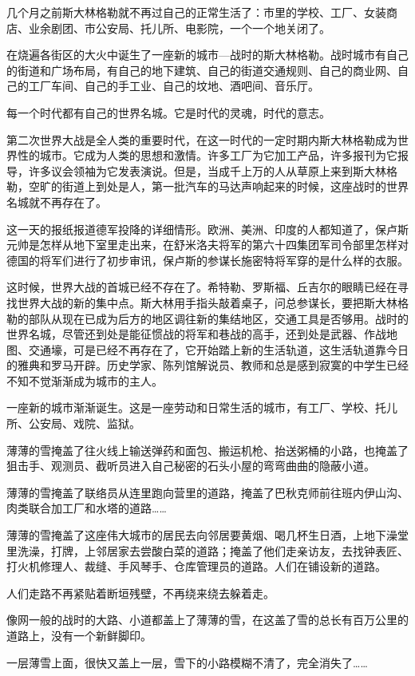 几个月之前斯大林格勒就不再过自己的正常生活了：市里的学校、工厂、女装商店、业余剧团、市公安局、托儿所、电影院，一个一个地关闭了。

在烧遍各街区的大火中诞生了一座新的城市—战时的斯大林格勒。战时城市有自己的街道和广场布局，有自己的地下建筑、自己的街道交通规则、自己的商业网、自己的工厂车间、自己的手工业、自己的坟地、酒吧间、音乐厅。

每一个时代都有自己的世界名城。它是时代的灵魂，时代的意志。

第二次世界大战是全人类的重要时代，在这一时代的一定时期内斯大林格勒成为世界性的城市。它成为人类的思想和激情。许多工厂为它加工产品，许多报刊为它报导，许多议会领袖为它发表演说。但是，当成千上万的人从草原上来到斯大林格勒，空旷的街道上到处是人，第一批汽车的马达声响起来的时候，这座战时的世界名城就不再存在了。

这一天的报纸报道德军投降的详细情形。欧洲、美洲、印度的人都知道了，保卢斯元帅是怎样从地下室里走出来，在舒米洛夫将军的第六十四集团军司令部里怎样对德国的将军们进行了初步审讯，保卢斯的参谋长施密特将军穿的是什么样的衣服。

这时候，世界大战的首城已经不存在了。希特勒、罗斯福、丘吉尔的眼睛已经在寻找世界大战的新的集中点。斯大林用手指头敲着桌子，问总参谋长，要把斯大林格勒的部队从现在已成为后方的地区调往新的集结地区，交通工具是否够用。战时的世界名城，尽管还到处是能征惯战的将军和巷战的高手，还到处是武器、作战地图、交通壕，可是已经不再存在了，它开始踏上新的生活轨道，这生活轨道靠今日的雅典和罗马开辟。历史学家、陈列馆解说员、教师和总是感到寂寞的中学生已经不知不觉渐渐成为城市的主人。

一座新的城市渐渐诞生。这是一座劳动和日常生活的城市，有工厂、学校、托儿所、公安局、戏院、监狱。

薄薄的雪掩盖了往火线上输送弹药和面包、搬运机枪、抬送粥桶的小路，也掩盖了狙击手、观测员、截听员进入自己秘密的石头小屋的弯弯曲曲的隐蔽小道。

薄薄的雪掩盖了联络员从连里跑向营里的道路，掩盖了巴秋克师前往班内伊山沟、肉类联合加工厂和水塔的道路……

薄薄的雪掩盖了这座伟大城市的居民去向邻居要黄烟、喝几杯生日酒，上地下澡堂里洗澡，打牌，上邻居家去尝酸白菜的道路；掩盖了他们走亲访友，去找钟表匠、打火机修理人、裁缝、手风琴手、仓库管理员的道路。人们在铺设新的道路。

人们走路不再紧贴着断垣残壁，不再绕来绕去躲着走。

像网一般的战时的大路、小道都盖上了薄薄的雪，在这盖了雪的总长有百万公里的道路上，没有一个新鲜脚印。

一层薄雪上面，很快又盖上一层，雪下的小路模糊不清了，完全消失了……

